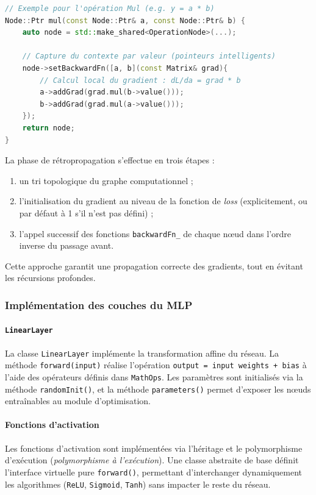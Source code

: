 \documentclass[a4paper,11pt]{article}
\begin{document}
\begin{lstlisting}[language=C++, caption={Utilisation de lambdas et de pointeurs intelligents (MathOps)}]
// Exemple pour l'opération Mul (e.g. y = a * b)
Node::Ptr mul(const Node::Ptr& a, const Node::Ptr& b) {
    auto node = std::make_shared<OperationNode>(...);

    // Capture du contexte par valeur (pointeurs intelligents)
    node->setBackwardFn([a, b](const Matrix& grad){
        // Calcul local du gradient : dL/da = grad * b
        a->addGrad(grad.mul(b->value()));
        b->addGrad(grad.mul(a->value()));
    });
    return node;
}
\end{lstlisting}

La phase de rétropropagation s'effectue en trois étapes :
\begin{enumerate}[label=\arabic*.]
  \item un tri topologique du graphe computationnel ;
  \item l'initialisation du gradient au niveau de la fonction de \textit{loss} (explicitement, ou par défaut à 1 s'il n'est pas défini) ;
  \item l'appel successif des fonctions \texttt{backwardFn\_} de chaque nœud dans l'ordre inverse du passage avant.
\end{enumerate}
Cette approche garantit une propagation correcte des gradients, tout en évitant les récursions profondes.

\subsubsection{Implémentation des couches du MLP}
\paragraph{\texttt{LinearLayer}} La classe \texttt{LinearLayer} implémente la transformation affine du réseau. La méthode \texttt{forward(input)} réalise l'opération \texttt{output = input \texttimes{} weights + bias} à l'aide des opérateurs définis dans \texttt{MathOps}. Les paramètres sont initialisés via la méthode \texttt{randomInit()}, et la méthode \texttt{parameters()} permet d'exposer les nœuds entraînables au module d'optimisation.

\paragraph{Fonctions d'activation} Les fonctions d'activation sont implémentées via l'héritage et le polymorphisme d'exécution (\emph{polymorphisme à l'exécution}). Une classe abstraite de base définit l'interface virtuelle pure \texttt{forward()}, permettant d'interchanger dynamiquement les algorithmes (\texttt{ReLU}, \texttt{Sigmoid}, \texttt{Tanh}) sans impacter le reste du réseau.
\end{document}
